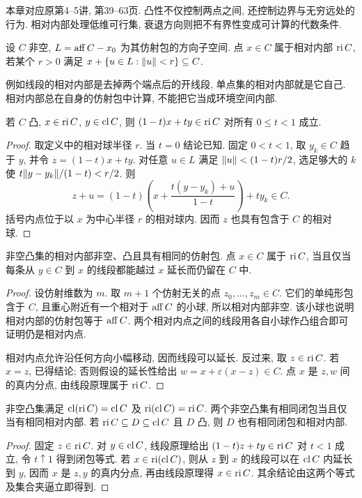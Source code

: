 \label{chap:2}
本章对应原第4--5讲, 第39--63页. 凸性不仅控制两点之间, 还控制边界与无穷远处的行为. 相对内部处理低维可行集, 衰退方向则把不有界性变成可计算的代数条件.

\begin{definition}
设 $C$ 非空, $L=\operatorname{aff} C-x_0$ 为其仿射包的方向子空间. 点 $x\in C$ 属于相对内部 $\operatorname{ri} C$, 若某个 $r>0$ 满足 $x+\{u\in L:\lVert u\rVert<r\}\subseteq C$.
\end{definition}
例如线段的相对内部是去掉两个端点后的开线段, 单点集的相对内部就是它自己. 相对内部总在自身的仿射包中计算, 不能把它当成环境空间内部.

\begin{theorem}[线段原理]\label{thm:segment}
若 $C$ 凸, $x\in\operatorname{ri} C$, $y\in\operatorname{cl} C$, 则 $(1-t)x+ty\in\operatorname{ri} C$ 对所有 $0\le t<1$ 成立.
\end{theorem}
\begin{proof}
取定义中的相对球半径 $r$. 当 $t=0$ 结论已知. 固定 $0<t<1$, 取 $y_k\in C$ 趋于 $y$, 并令 $z=(1-t)x+ty$. 对任意 $u\in L$ 满足 $\lVert u\rVert<(1-t)r/2$, 选足够大的 $k$ 使 $t\lVert y-y_k\rVert/(1-t)<r/2$. 则
\[
z+u=(1-t)\left(x+\frac{t(y-y_k)+u}{1-t}\right)+ty_k\in C.
\]
括号内点位于以 $x$ 为中心半径 $r$ 的相对球内. 因而 $z$ 也具有包含于 $C$ 的相对球.
\end{proof}
\begin{theorem}\label{thm:ri-basic}
非空凸集的相对内部非空、凸且具有相同的仿射包. 点 $x\in C$ 属于 $\operatorname{ri} C$, 当且仅当每条从 $y\in C$ 到 $x$ 的线段都能越过 $x$ 延长而仍留在 $C$ 中.
\end{theorem}
\begin{proof}
设仿射维数为 $m$. 取 $m+1$ 个仿射无关的点 $z_0,\ldots,z_m\in C$. 它们的单纯形包含于 $C$, 且重心附近有一个相对于 $\operatorname{aff} C$ 的小球, 所以相对内部非空. 该小球也说明相对内部的仿射包等于 $\operatorname{aff} C$. 两个相对内点之间的线段用各自小球作凸组合即可证明仍是相对内点.

相对内点允许沿任何方向小幅移动, 因而线段可以延长. 反过来, 取 $z\in\operatorname{ri} C$. 若 $x=z$, 已得结论; 否则假设的延长性给出 $w=x+\varepsilon(x-z)\in C$. 点 $x$ 是 $z,w$ 间的真内分点, 由线段原理属于 $\operatorname{ri} C$.
\end{proof}
\begin{proposition}
非空凸集满足 $\operatorname{cl}(\operatorname{ri} C)=\operatorname{cl} C$ 及 $\operatorname{ri}(\operatorname{cl} C)=\operatorname{ri} C$. 两个非空凸集有相同闭包当且仅当有相同相对内部. 若 $\operatorname{ri} C\subseteq D\subseteq\operatorname{cl} C$ 且 $D$ 凸, 则 $D$ 也有相同闭包和相对内部.
\end{proposition}
\begin{proof}
固定 $z\in\operatorname{ri} C$. 对 $y\in\operatorname{cl} C$, 线段原理给出 $(1-t)z+ty\in\operatorname{ri} C$ 对 $t<1$ 成立, 令 $t\uparrow1$ 得到闭包等式. 若 $x\in\operatorname{ri}(\operatorname{cl} C)$, 则从 $z$ 到 $x$ 的线段可以在 $\operatorname{cl} C$ 内延长到 $y$, 因而 $x$ 是 $z,y$ 的真内分点, 再由线段原理得 $x\in\operatorname{ri} C$. 其余结论由这两个等式及集合夹逼立即得到.
\end{proof}
